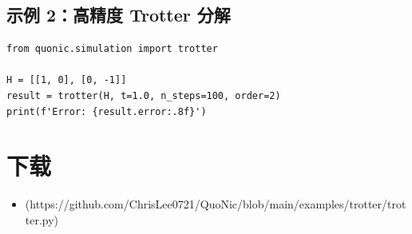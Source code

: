\documentclass[12pt,a4paper]{article}
\begin{document}
\subsection{示例 2：高精度 Trotter 分解}

\begin{verbatim}
from quonic.simulation import trotter

H = [[1, 0], [0, -1]]
result = trotter(H, t=1.0, n_steps=100, order=2)
print(f'Error: {result.error:.8f}')
\end{verbatim}

\section{下载}

\begin{itemize}
  \item [trotter.py](https://github.com/ChrisLee0721/QuoNic/blob/main/examples/trotter/trotter.py)
\end{itemize}
\end{document}
